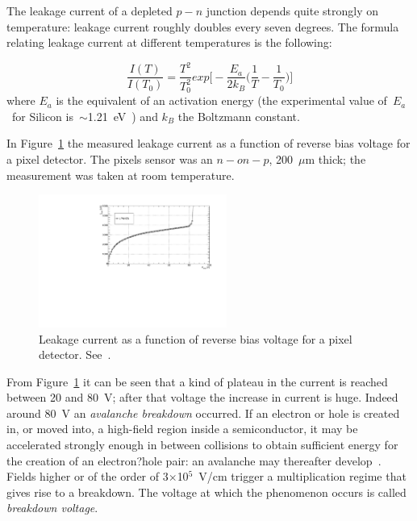 The leakage current of a depleted $p-n$ junction depends quite strongly on temperature: 
leakage current roughly doubles every seven degrees. The formula relating leakage 
current at different temperatures is the following:

\begin{equation}
\dfrac{I(T)}{I(T_0)}=\dfrac{T^2}{T_0^2}exp\Big[-\dfrac{E_a}{2k_B}\Big(\dfrac{1}{T}-\dfrac{1}{T_0}\Big)\Big]
\label{eq:IleakT}
\end{equation}
where $E_a$ is the equivalent of an activation energy (the experimental value of~$E_a$~for Silicon 
is~$\sim$1.21~eV~\cite{1748-0221-8-10-P10003}) and
$k_B$ the Boltzmann constant.



In Figure~\ref{fig:IV_LPNHE5} the measured leakage current as a function of reverse bias voltage for 
a pixel detector. The pixels sensor was an $n-on-p$, 200~$\mu$m thick; the measurement was 
taken at room temperature.
\begin{figure}
\centering
\includegraphics[width=0.55\textwidth]{IV_LPNHE5.pdf}
\caption{\label{fig:IV_LPNHE5}Leakage current as a function of reverse bias voltage for 
a pixel detector. See~\cite{bib:nim2012,2013arXiv1311.1628B}.}
\end{figure}
From Figure~\ref{fig:IV_LPNHE5} it can be seen that a kind of plateau in the current is reached 
between 20 and 80~V; after that voltage the increase in current is huge. Indeed around 80~V 
an {\it avalanche breakdown} occurred. If an electron or hole is created in, or moved into, a high-field 
region inside a semiconductor, it may be accelerated strongly enough in between collisions to obtain 
sufficient energy for the creation of an electron?hole pair: an avalanche may thereafter 
develop~\cite{Lutz:411172}.
Fields higher or of the order of 3$\times$10$^5$~V/cm trigger a multiplication regime that gives rise to a 
breakdown. The voltage at which the phenomenon occurs is called {\it breakdown voltage}.

